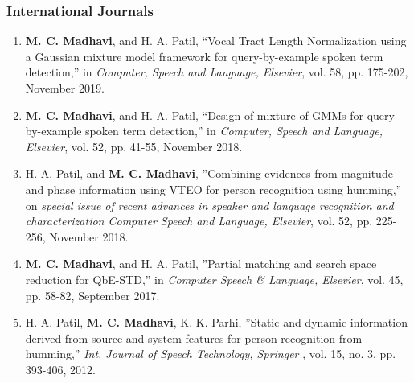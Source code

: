 \documentclass[10pt]{article}
\begin{document}
\subsubsection*{International Journals}
\begin{enumerate}
				\setlength\itemsep{-0.05em}
\item \textbf{M. C. Madhavi}, and H. A. Patil, ``Vocal Tract Length Normalization using a Gaussian mixture model framework for query-by-example spoken term detection,'' in \textit{Computer, Speech and Language, Elsevier}, vol. 58, pp. 175-202, November 2019.
\item \textbf{M. C. Madhavi}, and H. A. Patil, ``Design of mixture of GMMs for query-by-example spoken term detection,'' in \textit{Computer, Speech and Language, Elsevier}, vol. 52, pp. 41-55, November 2018.
\item H. A. Patil, and \textbf{M. C. Madhavi}, ''Combining evidences from magnitude and phase information using VTEO for person recognition using humming,'' on \textit{special issue of recent advances in speaker and language recognition and characterization Computer Speech and Language, Elsevier}, vol. 52, pp. 225-256, November 2018.
 \item \textbf{M. C. Madhavi}, and H. A. Patil, ''Partial matching and search space reduction for QbE-STD,'' in \textit{Computer Speech \& Language, Elsevier}, vol. 45, pp. 58-82, September 2017.
\item H. A. Patil, \textbf{M. C. Madhavi}, K. K. Parhi, ''Static and dynamic information derived from source and system features for person recognition from humming,'' \textit{Int. Journal of Speech Technology, Springer} , vol. 15, no. 3, pp. 393-406, 2012. 
\end{enumerate}
\end{document}
